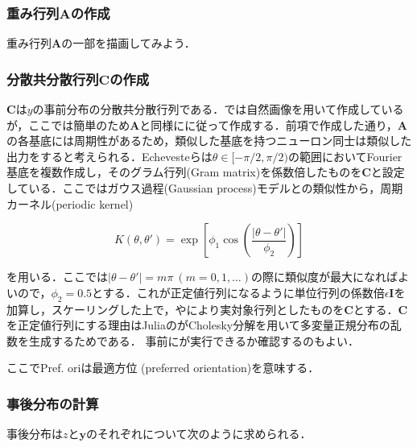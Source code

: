\subsubsection{重み行列$\mathbf{A}$の作成}




重み行列$\mathbf{A}$の一部を描画してみよう．


\subsubsection{分散共分散行列$\mathbf{C}$の作成}
$\mathbf{C}$は$y$の事前分布の分散共分散行列である．\cite{Orban2016-tm}では自然画像を用いて作成しているが，ここでは簡単のため$\mathbf{A}$と同様に\cite{Echeveste2020-sh}に従って作成する．前項で作成した通り，$\mathbf{A}$の各基底には周期性があるため，類似した基底を持つニューロン同士は類似した出力をすると考えられる．Echevesteらは$\theta\in[-\pi/2, \pi/2)$の範囲においてFourier基底を複数作成し，そのグラム行列(Gram matrix)を係数倍したものを$\mathbf{C}$と設定している．ここではガウス過程(Gaussian process)モデルとの類似性から，周期カーネル(periodic kernel) 


\begin{equation}
K(\theta, \theta')=\exp\left[\phi_1 \cos \left(\dfrac{|\theta-\theta'|}{\phi_2}\right)\right]
\end{equation}


を用いる．ここでは$|\theta-\theta'|=m\pi\ (m=0,1,\ldots)$の際に類似度が最大になればよいので，$\phi_2=0.5$とする．これが正定値行列になるように単位行列の係数倍$\epsilon\mathbf{I}$を加算し，スケーリングした上で，やにより実対象行列としたものを$\mathbf{C}$とする．$\mathbf{C}$を正定値行列にする理由はJuliaのがCholesky分解を用いて多変量正規分布の乱数を生成するためである． 事前にが実行できるか確認するのもよい．



ここでPref. oriは最適方位 (preferred orientation)を意味する．
\subsubsection{事後分布の計算}
事後分布は$z$と$\mathbf{y}$のそれぞれについて次のように求められる．



